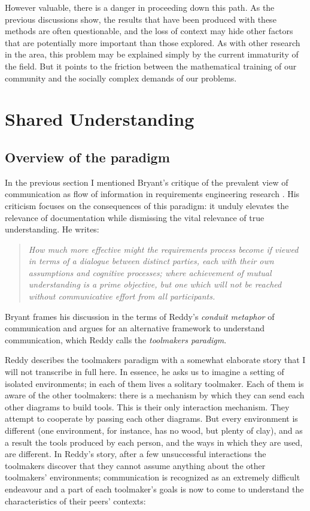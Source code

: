 However valuable, there is a danger in proceeding down this path. As the previous discussions show, the results that have been produced with these methods are often questionable, and the loss of context may hide other factors that are potentially more important than those explored. As with other research in the area, this problem may be explained simply by the current immaturity of the field. But it points to the friction between the mathematical training of our community and the socially complex demands of our problems.


\section{Shared Understanding}
\label{sec:SharedUnderstanding}

\subsection{Overview of the paradigm}

In the previous section I mentioned Bryant's critique of the prevalent view of communication as flow of information in requirements engineering research \cite{Bryant2000}. His criticism focuses on the consequences of this paradigm: it unduly elevates the relevance of documentation while dismissing the vital relevance of true understanding. He writes:

\begin{quote}
\emph{How much more effective might the requirements process become if viewed in terms of a dialogue between distinct parties, each with their own assumptions and cognitive processes; where achievement of mutual understanding is a prime objective, but one which will not be reached without communicative effort from all participants.}
\end{quote}

Bryant frames his discussion in the terms of Reddy's  \emph{conduit metaphor} of communication and argues for an alternative framework to understand communication, which Reddy calls the \emph{toolmakers paradigm}.

Reddy describes the toolmakers paradigm with a somewhat elaborate story that I will not transcribe in full here. In essence, he asks us to imagine a setting of isolated environments; in each of them lives a solitary toolmaker. Each of them is aware of the other toolmakers: there is a mechanism by which they can send each other diagrams to build tools. This is their only interaction mechanism. They attempt to cooperate by passing each other diagrams. But every environment is different (one environment, for instance, has no wood, but plenty of clay), and as a result the tools produced by each person, and the ways in which they are used, are different. In Reddy's story, after a few unsuccessful interactions the toolmakers discover that they cannot assume anything about the other toolmakers' environments; communication is recognized as an extremely difficult endeavour and a part of each toolmaker's goals is now to come to understand the characteristics of their peers' contexts:

